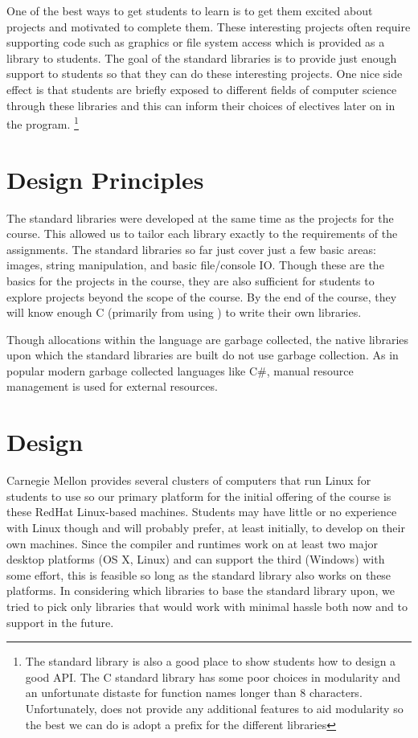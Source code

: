 One of the best ways to get students to learn is to get them excited about
projects and motivated to complete them. These interesting projects often
require supporting code such as graphics or file system access which is provided
as a library to students. The goal of the standard libraries is to provide just
enough support to students so that they can do these interesting projects. One
nice side effect is that students are briefly exposed to different fields of
computer science through these libraries and this can inform their choices of
electives later on in the program.  \footnote{The standard library is also a
good place to show students how to design a good API. The C standard library has
some poor choices in modularity and an unfortunate distaste for function names
longer than 8 characters.  Unfortunately, \langname{} does not provide any
additional features to aid modularity so the best we can do is adopt a prefix
for the different libraries}

\section{Design Principles}

The standard libraries were developed at the same time as the projects for the
course. This allowed us to tailor each library exactly to the requirements of
the assignments. The standard libraries so far just cover just a few basic
areas: images, string manipulation, and basic file/console IO. Though these are
the basics for the projects in the course, they are also sufficient for
students to explore projects beyond the scope of the course. By the end of the
course, they will know enough C (primarily from using \langname{}) to write
their own libraries.

Though allocations within the language are garbage collected, the native
libraries upon which the standard libraries are built do not use garbage
collection. As in popular modern garbage collected languages like C\#, manual
resource management is used for external resources.

\section{Design}

Carnegie Mellon provides several clusters of computers that run Linux for
students to use so our primary platform for the initial offering of the course
is these RedHat Linux-based machines. Students may have little or no experience
with Linux though and will probably prefer, at least initially, to develop on
their own machines. Since the compiler and runtimes work on at least two major
desktop platforms (OS X, Linux) and can support the third (Windows) with some
effort, this is feasible so long as the standard library also works on these
platforms.  In considering which libraries to base the standard library upon, we
tried to pick only libraries that would work with minimal hassle both now and to
support in the future.

